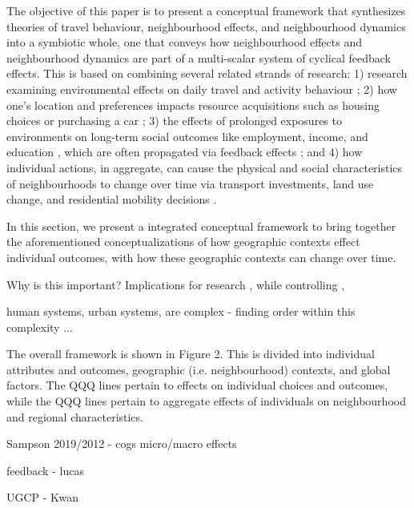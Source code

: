 The objective of this paper is to present a conceptual framework that synthesizes theories of travel behaviour, neighbourhood effects, and neighbourhood dynamics into a symbiotic whole, one that conveys how neighbourhood effects and neighbourhood dynamics are part of a multi-scalar system of cyclical feedback effects. This is based on combining several related strands of research: 1) research examining environmental effects on daily travel and activity behaviour \cite{hanson_determinants_1982,ewing_travel_2010}; 2) how one's location and preferences impacts resource acquisitions such as housing choices or purchasing a car \cite{lee_neighborhood_1994,klein_millennials_2017}; 3) the effects of prolonged exposures to environments on long-term social outcomes like employment, income, and education \cite{sampson_assessing_2002,chetty_effects_2016}, which are often propagated via feedback effects \cite{wilson_truly_2012,lucas_transport_2012}; and 4) how individual actions, in aggregate, can cause the physical and social characteristics of neighbourhoods to change over time via transport investments, land use change, and residential mobility decisions \cite{wegener_land-use_2004,wilson_truly_2012,van_ham_understanding_2013}. 



In this section, we present a integrated conceptual framework to bring together the aforementioned conceptualizations of how geographic contexts effect individual outcomes, with how these geographic contexts can change over time. 

Why is this important? Implications for research , while controlling , 

human systems, urban systems, are complex - finding order within this complexity ...

The overall framework is shown in Figure 2. This is divided into individual attributes and outcomes, geographic (i.e. neighbourhood) contexts, and global factors. The QQQ lines pertain to effects on individual choices and outcomes, while the QQQ lines pertain to aggregate effects of individuals on neighbourhood and regional characteristics.

Sampson 2019/2012 - cogs micro/macro effects

feedback - lucas

UGCP - Kwan





